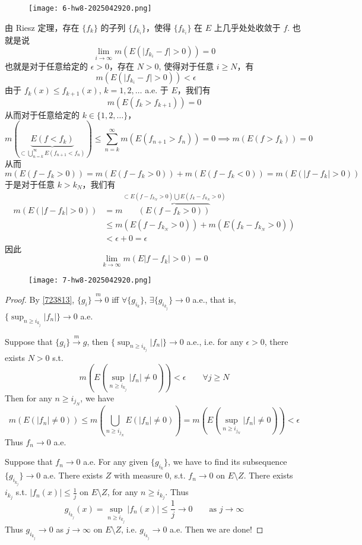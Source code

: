 \begin{exercise}
\begin{figure}[H]
\centering
\texttt{[image: 6-hw8-2025042920.png]}
\label{}
\end{figure}
\end{exercise}
由 Riesz 定理，存在 $\{ f_k \}$ 的子列 $\{ f_{k_i} \}$，使得 $\{ f_{k_i} \}$ 在 $E$ 上几乎处处收敛于 $f$. 也就是说
\[
\lim_{ i \to \infty } m(E(\lvert f_{k_i}-f \rvert >0))=0
\]
也就是对于任意给定的 $\epsilon>0$，存在 $N>0$, 使得对于任意 $i\geq N$，有
\[
m(E(\lvert f_{k_i}-f \rvert >0))<\epsilon \qquad
\]
由于 $f_k(x)\leq f_{k+1}(x)$, $k=1,2,\dots$ a.e. 于 $E$，我们有
\[
m(E(f_k>f_{k+1}))=0
\]
从而对于任意给定的 $k\in \{ 1,2,\dots \}$，
\[
m\left( \underbrace{ E(f<f_{k}) }_{ \subset \bigcup_{n=k}^{\infty} E(f_{n+1}<f_n) } \right)\leq \sum_{n=k}^{\infty} m(E(f_{n+1}>f_n))=0\implies m(E(f>f_k))=0
\]
从而
\[
m(E(f-f_{k}>0))=m(E(f-f_{k}>0))+m(E(f-f_{k}<0))=m(E(\lvert f-f_{k} \rvert >0))
\]
于是对于任意 $k>k_{N}$，我们有
\[
\begin{aligned}
m(E(\lvert f-f_{k} \rvert >0)) & =m\overbrace{ (E(f-f_k>0)  ) }^{ \subset E(f-f_{k_{N}}>0)\bigcup E(f_{k}-f_{k_{N}}>0) } \\
 & \leq m(E(f-f_{k_{N}}>0))+m(E(f_{k}-f_{k_{N}}>0)) \\
 & <\epsilon+0=\epsilon
\end{aligned}
\]
因此
\[
\lim_{ k \to \infty } m(E\lvert f-f_k \rvert >0)=0
\]
\begin{exercise}
\begin{figure}[H]
\centering
\texttt{[image: 7-hw8-2025042920.png]}
\label{}
\end{figure}
\end{exercise}
\begin{proof}
By \cref{723813}, $\{ g_i \}\overset{ m }{ \to }0$ iff $\forall \{ g_{i_k} \}$, $\exists \{ g_{i_{k_j}} \}\to0$ a.e., that is, $\{ \sup_{n\geq i_{k_{j}}}\lvert f_n \rvert \}\to0$ a.e.

Suppose that $\{ g_i \}\overset{ m }{ \to }g$, then $\{ \sup_{n\geq i_{k_j}}\lvert f_n \rvert \}\to0$ a.e., i.e. for any $\epsilon>0$, there exists $N>0$ s.t.
\[
m(E(\sup_{n\geq i_{k_j}}\lvert f_n \rvert \neq 0))<\epsilon \qquad \forall j\geq N
\]
Then for any $n\geq i_{j_{N}}$, we have
\[
m(E(\lvert f_n \rvert \neq 0))\leq m\left( \bigcup_{n\geq i_{j_{N}}}^{} E(\lvert f_n \rvert \neq 0) \right)=m(E(\sup_{n\geq i_{j_{N}}}\lvert f_n \rvert \neq 0))<\epsilon
\]
Thus $f_n\to0$ a.e.

Suppose that $f_n\to0$ a.e. For any given $\{ g_{i_k} \}$, we have to find its subsequence $\{ g_{i_{k_j}} \}\to0$ a.e. There exists $Z$ with measure 0, s.t. $f_n\to0$ on $E\setminus Z$. There exists $i_{k_{j}}$ s.t. $\lvert f_n(x) \rvert\leq\frac{1}{j}$ on $E\setminus Z$, for any $n\geq i_{k_{j}}$. Thus
\[
g_{i_{k_{j}}}(x)=\sup_{n\geq i_{k_{j}}}\lvert f_n(x) \rvert \leq \frac{1}{j}\to0\qquad \text{as }j\to \infty
\]
Thus $g_{i_{k_j}}\to0$ as $j\to \infty$ on $E\setminus Z$, i.e. $g_{i_{k_j}}\to0$ a.e. Then we are done!
\end{proof}

